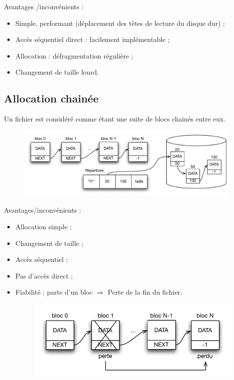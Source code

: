 \documentclass[11pt,english,french]{scrreprt}
\theoremstyle{remark}
\theoremstyle{definition}
\newcommand*\Pitem{%
  \item[\color{green}\scalebox{0.9}{\textbullet}]}
\newcommand*\Citem{%
  \item[\color{red}\scalebox{0.9}{\textbullet}]}
\begin{document}
Avantages /inconvénients :
\begin{itemize}
	\Pitem Simple, performant (déplacement des têtes de lecture du disque dur) ;
	\Pitem Accès séquentiel direct : facilement implémentable ;
	\Citem Allocation : défragmentation régulière ;
	\Citem Changement de taille lourd.
\end{itemize}

\subsection{Allocation chainée}
Un fichier est considéré comme étant une suite de blocs chainés entre eux.

\begin{figure}[h!]
	\center
	\vspace{-15pt}
	\includegraphics[scale=.75]{img/allocation-chainee}
	\vspace{-20pt}
\end{figure}

Avantages/inconvénients :
\begin{itemize}
	\Pitem Allocation simple ;
	\Pitem Changement de taille ;
	\Pitem Accès séquentiel ;
	\Citem Pas d'accès direct ;
	\Citem Fiabilité : parte d'un bloc $\Rightarrow$ Perte de la fin du fichier.
	\begin{figure}[h!]
		\center
		\vspace{-15pt}
		\includegraphics[scale=.75]{img/allocation-chainee-inconvenient}
		\vspace{-15pt}
	\end{figure}
\end{itemize}
\end{document}
